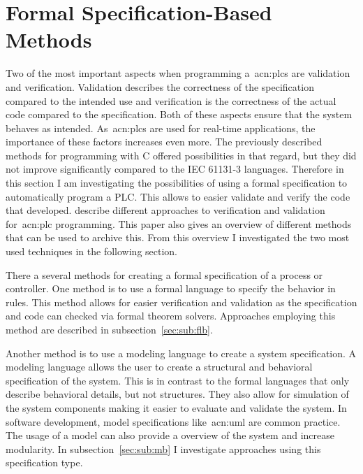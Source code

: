 \chapter{Formal Specification-Based Methods}
\label{sec:formal_methods}

Two of the most important aspects when programming a~\glspl{acn:plc} are validation and verification.
Validation describes the correctness of the specification compared to the intended use and verification is the correctness of the actual code compared to the specification.
Both of these aspects ensure that the system behaves as intended.
As~\glspl{acn:plc} are used for real-time applications, the importance of these factors increases even more.
The previously described methods for programming with C offered possibilities in that regard, but they did not improve significantly compared to the IEC 61131-3 languages.
Therefore in this section I am investigating the possibilities of using a formal specification to automatically program a PLC.
This allows to easier validate and verify the code that developed.
\citeauthor{Frey:2000aa} describe different approaches to verification and validation for~\acrshort{acn:plc} programming.
This paper also gives an overview of different methods that can be used to archive this.
From this overview I investigated the two most used techniques in the following section.

There a several methods for creating a formal specification of a process or controller.
One method is to use a formal language to specify the behavior in rules.
This method allows for easier verification and validation as the specification and code can checked via formal theorem solvers.
Approaches employing this method are described in subsection~\ref{sec:sub:flb}.

Another method is to use a modeling language to create a system specification.
A modeling language allows the user to create a structural and behavioral specification of the system.
This is in contrast to the formal languages that only describe behavioral details, but not structures.
They also allow for simulation of the system components making it easier to evaluate and validate the system.
In software development, model specifications like~\acrfull{acn:uml} are common practice.
The usage of a model can also provide a overview of the system and increase modularity.
In subsection~\ref{sec:sub:mb} I investigate approaches using this specification type.

